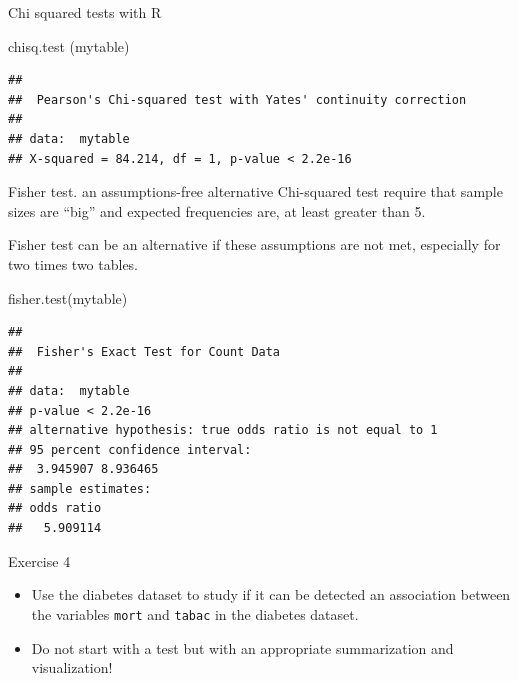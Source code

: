 \documentclass[
  ignorenonframetext,
]{beamer}
\newenvironment{Shaded}{\begin{snugshade}}{\end{snugshade}}
\newcommand{\FunctionTok}[1]{\textcolor[rgb]{0.00,0.00,0.00}{#1}}
\newcommand{\NormalTok}[1]{#1}
\begin{document}
\begin{frame}[fragile]{Chi squared tests with R}
\protect\hypertarget{chi-squared-tests-with-r}{}
\begin{Shaded}
\begin{Highlighting}[]
\FunctionTok{chisq.test}\NormalTok{ (mytable)}
\end{Highlighting}
\end{Shaded}

\begin{verbatim}
## 
##  Pearson's Chi-squared test with Yates' continuity correction
## 
## data:  mytable
## X-squared = 84.214, df = 1, p-value < 2.2e-16
\end{verbatim}
\end{frame}

\begin{frame}[fragile]{Fisher test. an assumptions-free alternative}
\protect\hypertarget{fisher-test.-an-assumptions-free-alternative}{}
Chi-squared test require that sample sizes are ``big'' and expected
frequencies are, at least greater than 5.

Fisher test can be an alternative if these assumptions are not met,
especially for two times two tables.

\begin{Shaded}
\begin{Highlighting}[]
\FunctionTok{fisher.test}\NormalTok{(mytable)}
\end{Highlighting}
\end{Shaded}

\begin{verbatim}
## 
##  Fisher's Exact Test for Count Data
## 
## data:  mytable
## p-value < 2.2e-16
## alternative hypothesis: true odds ratio is not equal to 1
## 95 percent confidence interval:
##  3.945907 8.936465
## sample estimates:
## odds ratio 
##   5.909114
\end{verbatim}
\end{frame}

\begin{frame}[fragile]{Exercise 4}
\protect\hypertarget{exercise-4}{}
\begin{itemize}
\item
  Use the diabetes dataset to study if it can be detected an association
  between the variables \texttt{mort} and \texttt{tabac} in the diabetes
  dataset.
\item
  Do not start with a test but with an appropriate summarization and
  visualization!
\end{itemize}
\end{frame}
\end{document}
